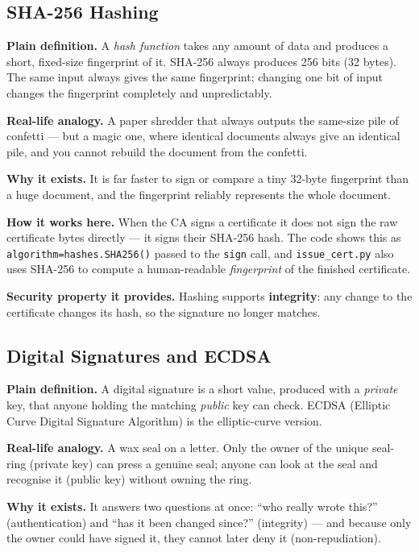 \documentclass[11pt,a4paper]{report}
\begin{document}
\subsection{SHA-256 Hashing}
\textbf{Plain definition.} A \emph{hash function} takes any amount of data and
produces a short, fixed-size fingerprint of it. SHA-256 always produces 256 bits
(32 bytes). The same input always gives the same fingerprint; changing one bit
of input changes the fingerprint completely and unpredictably.

\textbf{Real-life analogy.} A paper shredder that always outputs the same-size
pile of confetti --- but a magic one, where identical documents always give an
identical pile, and you cannot rebuild the document from the confetti.

\textbf{Why it exists.} It is far faster to sign or compare a tiny 32-byte
fingerprint than a huge document, and the fingerprint reliably represents the
whole document.

\textbf{How it works here.} When the CA signs a certificate it does not sign the
raw certificate bytes directly --- it signs their SHA-256 hash. The code shows
this as \texttt{algorithm=hashes.SHA256()} passed to the \texttt{sign} call, and
\texttt{issue\_cert.py} also uses SHA-256 to compute a human-readable
\emph{fingerprint} of the finished certificate.

\textbf{Security property it provides.} Hashing supports \textbf{integrity}: any
change to the certificate changes its hash, so the signature no longer matches.

\subsection{Digital Signatures and ECDSA}
\textbf{Plain definition.} A digital signature is a short value, produced with a
\emph{private} key, that anyone holding the matching \emph{public} key can check.
ECDSA (Elliptic Curve Digital Signature Algorithm) is the elliptic-curve version.

\textbf{Real-life analogy.} A wax seal on a letter. Only the owner of the unique
seal-ring (private key) can press a genuine seal; anyone can look at the seal and
recognise it (public key) without owning the ring.

\textbf{Why it exists.} It answers two questions at once: ``who really wrote
this?'' (authentication) and ``has it been changed since?'' (integrity) --- and
because only the owner could have signed it, they cannot later deny it
(non-repudiation).
\end{document}
